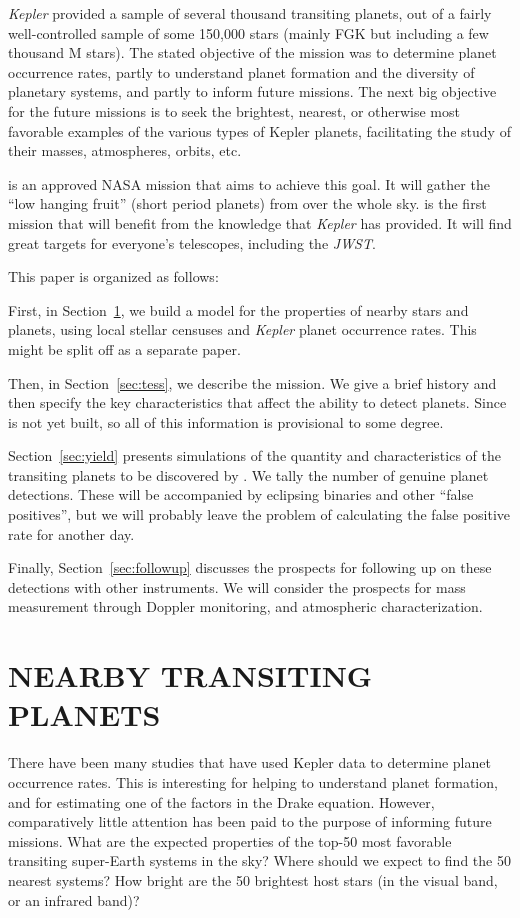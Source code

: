 \documentclass{emulateapj}
\begin{document}
{\it Kepler} provided a sample of several thousand transiting planets,
out of a fairly well-controlled sample of some 150,000 stars (mainly
FGK but including a few thousand M stars).  The stated objective of
the mission was to determine planet occurrence rates, partly to
understand planet formation and the diversity of planetary systems,
and partly to inform future missions.  The next big objective for the
future missions is to seek the brightest, nearest, or otherwise most
favorable examples of the various types of Kepler planets,
facilitating the study of their masses, atmospheres, orbits, etc.

\tess is an approved NASA mission that aims to achieve this goal.  It
will gather the ``low hanging fruit'' (short period planets) from over
the whole sky. \tess is the first mission that will benefit from the
knowledge that {\it Kepler} has provided.  It will find great targets
for everyone's telescopes, including the {\it JWST}.

This paper is organized as follows:

First, in Section~\ref{sec:stars_and_planets}, we build a model for
the properties of nearby stars and planets, using local stellar
censuses and {\it Kepler} planet occurrence rates. This might be split
off as a separate paper.

Then, in Section~\ref{sec:tess}, we describe the \tess mission.  We
give a brief history and then specify the key characteristics that
affect the ability to detect planets. Since \tess is not yet built, so
all of this information is provisional to some degree.

Section~\ref{sec:yield} presents simulations of the quantity and
characteristics of the transiting planets to be discovered by \tess.
We tally the number of genuine planet detections.  These will be
accompanied by eclipsing binaries and other ``false positives'', but
we will probably leave the problem of calculating the false positive
rate for another day.

Finally, Section~\ref{sec:followup} discusses the prospects for
following up on these detections with other instruments. We will
consider the prospects for mass measurement through Doppler
monitoring, and atmospheric characterization.

\section{NEARBY TRANSITING PLANETS}
\label{sec:stars_and_planets}
There have been many studies that have used Kepler data to determine
planet occurrence rates. This is interesting for helping to understand
planet formation, and for estimating one of the factors in the Drake
equation. However, comparatively little attention has been paid to the
purpose of informing future missions.  What are the expected
properties of the top-50 most favorable transiting super-Earth systems
in the sky? Where should we expect to find the 50 nearest systems? How
bright are the 50 brightest host stars (in the visual band, or an
infrared band)?
\end{document}
